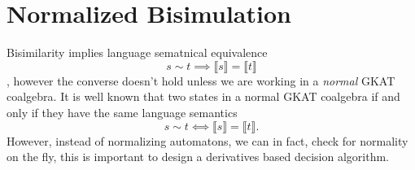 \documentclass[acmsmall,screen]{acmart}
\newtheorem{lemma}{Lemma}
\newtheorem{definition}{Definition}
\begin{document}





\section{Normalized Bisimulation}

Bisimilarity implies language sematnical equivalence \[s ∼ t ⟹ ⟦s⟧ = ⟦t⟧\], however the converse doesn't hold unless we are working in a \emph{normal} GKAT coalgebra.
It is well known that two states in a normal GKAT coalgebra if and only if they have the same language semantics \[s ∼ t ⟺ ⟦s⟧ = ⟦t⟧.\]
However, instead of normalizing automatons, we can in fact, check for normality on the fly, this is important to design a derivatives based decision algorithm.
\end{document}
